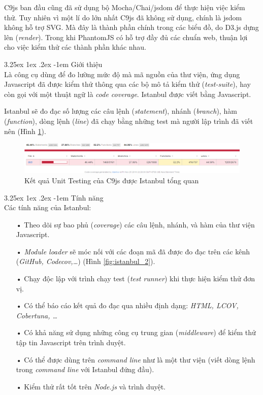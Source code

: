\documentclass[12pt,a4paper]{article}
\makeatletter
\let\newcounter\@gobble\let\setcounter\@gobbletwo
\newcommand{\myparagraph}[1]{\paragraph{#1}\mbox{}\\} %
\newcounter{subsubsubsection}[subsubsection]
\renewcommand\paragraph{\@startsection{paragraph}{5}{\z@}%
  {3.25ex \@plus1ex \@minus.2ex}%
  {-1em}%
  {\normalfont\normalsize\bfseries}}
\makeatother
\begin{document}
C9js ban đầu cũng đã sử dụng bộ Mocha/Chai/jsdom để thực hiện việc kiểm thử. Tuy nhiên vì một lí do lớn nhất C9js đã không sử dụng, chính là jsdom không hỗ trợ SVG. Mà đây là thành phần chính trong các biểu đồ, do D3.js dựng lên (\textit{render}). Trong khi PhantomJS có hỗ trợ đầy đủ các chuẩn web, thuận lợi cho việc kiểm thử các thành phần khác nhau.

\label{sec:istanbul}
\myparagraph{Giới thiệu}
Là công cụ dùng để đo lường mức độ mà mã nguồn của thư viện, ứng dụng Javascript đã được kiểm thử thông qua các bộ mô tả kiểm thử (\textit{test-suite}), hay còn gọi với một thuật ngữ là \textit{code coverage}. Istanbul được viết bằng Javascript.

Istanbul sẽ đo đạc số lượng các câu lệnh (\textit{statement}), nhánh (\textit{branch}), hàm (\textit{function}), dòng lệnh (\textit{line}) đã chạy bằng những test mà người lập trình đã viết nên (Hình \ref{fig:istanbul_1}).

\begin{figure}[!h]
	\begin{center}
    \includegraphics[scale=.5]{image/istanbul_1}
    \caption{Kết quả Unit Testing của C9js được Istanbul tổng quan}
    \label{fig:istanbul_1}
	\end{center}
\end{figure}

\myparagraph{Tính năng}
Các tính năng của Istanbul:
\begin{itemize}
\item[•] Theo dõi sự bao phủ (\textit{coverage}) các câu lệnh, nhánh, và hàm của thư viện Javascript.
\item[•] \textit{Module loader} sẽ móc nối với các đoạn mã đã được đo đạc trên các kênh (\textit{GitHub, Codecov,…}) (Hình \ref{fig:istanbul_2}).
\item[•] Chạy độc lập với trình chạy test (\textit{test runner}) khi thực hiện kiểm thử đơn vị.
\item[•] Có thể báo cáo kết quả đo đạc qua nhiều định dạng: \textit{HTML, LCOV, Cobertuna, …}
\item[•] Có khả năng sử dụng những công cụ trung gian (\textit{middleware}) để kiểm thử tập tin Javascript trên trình duyệt.
\item[•] Có thể được dùng trên \textit{command line} như là một thư viện (viết dòng lệnh trong \textit{command line} với Istanbul đứng đầu).
\item[•] Kiểm thử rất tốt trên \textit{Node.js} và trình duyệt.
\end{itemize}
\end{document}
